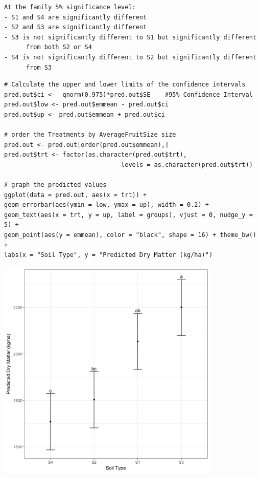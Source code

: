 \documentclass[a4paper, 10pt, fleqn, twosided]{memoir}
\begin{document}
\begin{tcolorbox}[title = Example 4 Prediction interpretation]
\begin{verbatim}
At the family 5% significance level:
- S1 and S4 are significantly different
- S2 and S3 are significantly different
- S3 is not significantly different to S1 but significantly different
      from both S2 or S4
- S4 is not significantly different to S2 but significantly different
      from S3
\end{verbatim}
\end{tcolorbox}
\begin{tcolorbox}[title = Example 4 Graph of predicted values]
\begin{verbatim}
# Calculate the upper and lower limits of the confidence intervals
pred.out$ci <-  qnorm(0.975)*pred.out$SE    #95% Confidence Interval
pred.out$low <- pred.out$emmean - pred.out$ci
pred.out$up <- pred.out$emmean + pred.out$ci

# order the Treatments by AverageFruitSize size
pred.out <- pred.out[order(pred.out$emmean),]
pred.out$trt <- factor(as.character(pred.out$trt),
                                levels = as.character(pred.out$trt))
 
# graph the predicted values 
ggplot(data = pred.out, aes(x = trt)) +
geom_errorbar(aes(ymin = low, ymax = up), width = 0.2) +
geom_text(aes(x = trt, y = up, label = groups), vjust = 0, nudge_y = 5) +
geom_point(aes(y = emmean), color = "black", shape = 16) + theme_bw() +
labs(x = "Soil Type", y = "Predicted Dry Matter (kg/ha)")
\end{verbatim}
\end{tcolorbox}


\begin{tcolorbox}[title = Example 4 Graph of predicted values]
\includegraphics[width=0.8\textwidth, frame]{Example4Pred.png}
\end{tcolorbox}
\clearpage
\end{document}
